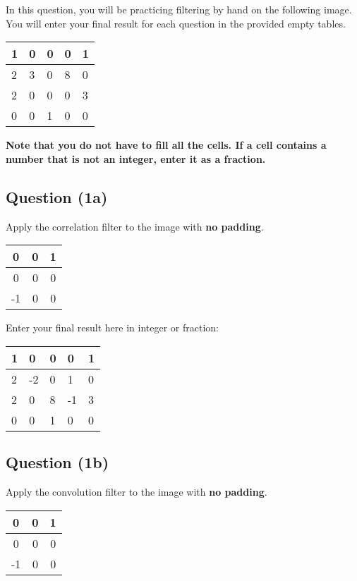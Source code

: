 \documentclass[12pt]{article}
\begin{document}

\noindent In this question, you will be practicing filtering by hand on the following image. You will enter your final result for each question in the provided empty tables.

\begin{center}
\begin{tabular}{|l|l|l|l|l|}
\hline
1 & 0 & 0 & 0 & 1 \\ \hline
2 & 3 & 0 & 8 & 0 \\ \hline
2 & 0 & 0 & 0 & 3 \\ \hline
0 & 0 & 1 & 0 & 0 \\ \hline
\end{tabular}
\end{center}
\textbf{Note that you do not have to fill all the cells. If a cell contains a number that is not an integer, enter it as a fraction.}

\subsection*{Question (1a)} Apply the correlation filter to the image with \textbf{no padding}.
\begin{center}
\begin{tabular}{|c|c|c|}
\hline
0  & 0 & 1 \\ \hline
0  & 0 & 0 \\ \hline
-1 & 0 & 0 \\ \hline
\end{tabular}
\end{center}

\noindent Enter your final result here in integer or fraction:

\begin{center}
\begin{tabular}{|l|l|l|l|l|}
\hline
1 & 0 & 0 & 0 & 1 \\ \hline
2 & -2 & 0 & 1 & 0 \\ \hline
2 & 0 & 8 & -1 & 3 \\ \hline
0 & 0 & 1 & 0 & 0 \\ \hline
\end{tabular}
\end{center}

\subsection*{Question (1b)} Apply the convolution filter to the image with \textbf{no padding}.
\begin{center}
\begin{tabular}{|c|c|c|}
\hline
0  & 0 & 1 \\ \hline
0  & 0 & 0 \\ \hline
-1 & 0 & 0 \\ \hline
\end{tabular}
\end{center}
\end{document}
